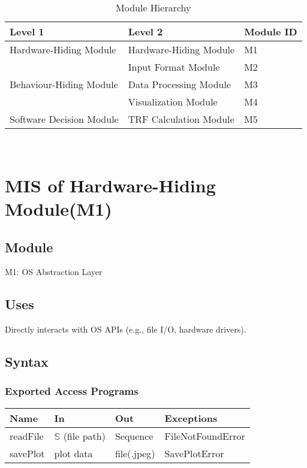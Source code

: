 \documentclass[12pt, titlepage]{article}
\begin{document}
\begin{table}[h!]
\centering
\begin{tabular}{p{} p{}p{}}
\toprule
\textbf{Level 1} & \textbf{Level 2}& \textbf{Module ID}\\
\midrule

{Hardware-Hiding Module} &  Hardware-Hiding Module
 & M1 \\
\midrule

\multirow{3}{0.3\textwidth}{Behaviour-Hiding Module}
& Input Format Module & M2\\
& Data Processing Module & M3\\
& Visualization Module & M4\\

\midrule

\multirow{1}{0.3\textwidth}{Software Decision Module} & TRF Calculation Module & M5\\
\bottomrule

\end{tabular}
\caption{Module Hierarchy}
\label{TblMH}
\end{table}


\newpage
~\newpage

\section{MIS of Hardware-Hiding Module(M1)}

\subsection{Module}
M1: OS Abstraction Layer

\subsection{Uses}

\item Directly interacts with OS APIs (e.g., file I/O, hardware drivers).


\subsection{Syntax}

\subsubsection{Exported Access Programs}

\begin{center}
\begin{tabular}{p{2cm} p{4cm} p{4cm} p{4cm}}
\hline
\textbf{Name} & \textbf{In} & \textbf{Out} & \textbf{Exceptions} \\
\hline
readFile & $\mathbb{S}$ (file path) & Sequence & FileNotFoundError \\
savePlot & plot data & file(.jpeg) & SavePlotError \\
\hline
\end{tabular}
\end{center}
\end{document}
